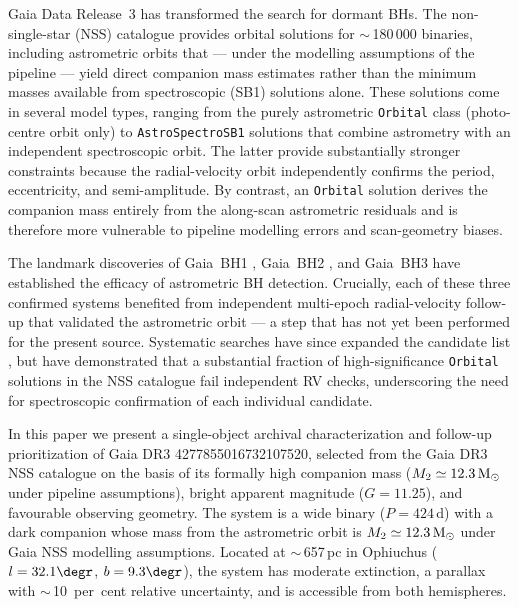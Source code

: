 \documentclass[usenatbib,fleqn]{mnras}
\newcommand{\Msun}{{\rm M}_\odot}
\begin{document}
Gaia Data Release~3 \citep[DR3;][]{GaiaCollaboration2023} has
transformed the search for dormant BHs.  The non-single-star (NSS)
catalogue \citep{GaiaNSS2023} provides orbital solutions for
$\sim$\,180\,000 binaries, including astrometric orbits that ---
under the modelling assumptions of the pipeline --- yield direct
companion mass estimates rather than the minimum masses
available from spectroscopic (SB1) solutions alone.  These solutions
come in several model types, ranging from the purely astrometric
\texttt{Orbital} class (photo-centre orbit only) to
\texttt{AstroSpectroSB1} solutions that combine astrometry with an
independent spectroscopic orbit.  The latter provide substantially
stronger constraints because the radial-velocity orbit independently
confirms the period, eccentricity, and semi-amplitude.  By contrast,
an \texttt{Orbital} solution derives the companion mass entirely from
the along-scan astrometric residuals and is therefore more vulnerable
to pipeline modelling errors and scan-geometry biases.

The landmark discoveries of Gaia~BH1
\citep[$M_2 \approx 9.6\,\Msun$;][]{ElBadry2023a}, Gaia~BH2
\citep[$M_2 \approx 8.9\,\Msun$;][]{ElBadry2023b}, and Gaia~BH3
\citep[$M_2 \approx 33\,\Msun$;][]{GaiaBH3_2024} have established
the efficacy of astrometric BH detection.  Crucially, each of these
three confirmed systems benefited from independent multi-epoch
radial-velocity follow-up that validated the astrometric orbit ---
a step that has not yet been performed for the present source.
Systematic searches have since expanded the candidate list
\citep{Jayasinghe2021, Thompson2019, Shenar2022, Mahy2022}, but
\citet{ElBadry2024} have demonstrated that a substantial fraction
of high-significance \texttt{Orbital} solutions in the NSS catalogue
fail independent RV checks, underscoring the need for spectroscopic
confirmation of each individual candidate.

In this paper we present a single-object archival
characterization and follow-up prioritization of
Gaia DR3 4277855016732107520, selected from the
Gaia DR3 NSS catalogue on the basis of its formally
high companion mass ($M_2 \simeq 12.3\,\Msun$ under pipeline
assumptions), bright apparent magnitude ($G = 11.25$), and
favourable observing geometry.
The system is a wide binary
($P = 424$\,d) with a dark companion whose
mass from the astrometric orbit is $M_2 \simeq 12.3\,\Msun$
under Gaia NSS modelling assumptions.  Located at
$\sim$\,657\,pc in Ophiuchus ($l = 32.1\degr$, $b = 9.3\degr$),
the system has moderate extinction, a parallax with
$\sim$\,10~per~cent relative uncertainty, and is accessible from
both hemispheres.
\end{document}
